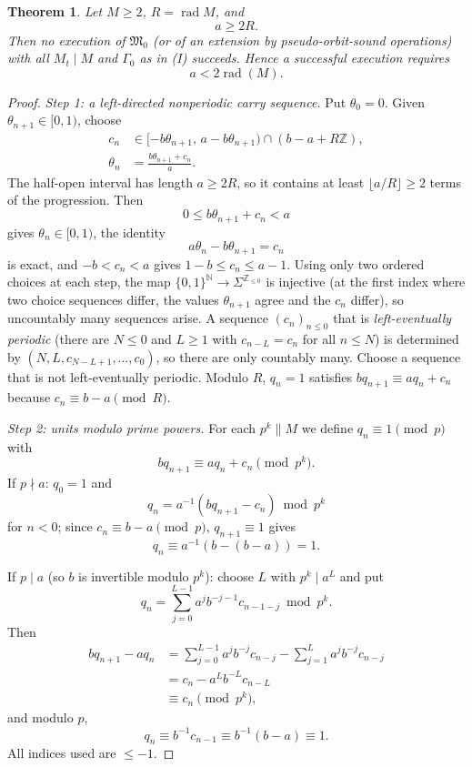 \documentclass[11pt,reqno]{amsart}
\newtheorem{theorem}{Theorem}
\theoremstyle{definition}
\theoremstyle{remark}
\begin{document}
\begin{samepage}
\begin{theorem}\leavevmode\label{thm:39}
Let \(M\ge2\), \(R=\operatorname{rad}M\), and
\[
a\ge2R.
\]
Then no execution of \(\mathfrak M_0\) (or of an extension by
pseudo-orbit-sound operations) with all \(M_t\mid M\) and \(\Gamma_0\) as
in (I) succeeds. Hence a successful execution requires
\[
a<2\operatorname{rad}(M).
\tag{27}\label{eq:27}
\]
\label{thm-end:39}
\end{theorem}
\end{samepage}

\begin{proof}\leavevmode\label{proof:39}
\emph{Step 1: a left-directed nonperiodic carry sequence.} Put
\(\theta_0=0\). Given \(\theta_{n+1}\in[0,1)\), choose
\[
\begin{aligned}
c_n&\in[-b\theta_{n+1},\,a-b\theta_{n+1})\cap(b-a+R\mathbb Z),\\
\theta_n&=\frac{b\theta_{n+1}+c_n}{a}.
\end{aligned}
\]
The half-open interval has length \(a\ge2R\), so it contains at least
\(\lfloor a/R\rfloor\ge2\) terms of the progression. Then
\[
0\le b\theta_{n+1}+c_n<a
\]
gives \(\theta_n\in[0,1)\), the identity
\[
a\theta_n-b\theta_{n+1}=c_n
\]
is exact, and \(-b<c_n<a\) gives
\(1-b\le c_n\le a-1\). Using only two ordered choices at each step, the
map \(\{0,1\}^{\mathbb N}\to\Sigma^{\mathbb Z_{\le0}}\) is injective
(at the first index where two choice sequences differ, the values
\(\theta_{n+1}\) agree and the \(c_n\) differ), so uncountably many
sequences arise. A sequence \((c_n)_{n\le0}\) that is \emph{left-eventually
periodic} (there are \(N\le0\) and \(L\ge1\) with \(c_{n-L}=c_n\) for
all \(n\le N\)) is determined by \((N,L,c_{N-L+1},\ldots,c_0)\), so
there are only countably many. Choose a sequence that is not
left-eventually periodic. Modulo \(R\), \(q_n=1\) satisfies
\(bq_{n+1}\equiv aq_n+c_n\) because \(c_n\equiv b-a\pmod R\).

\emph{Step 2: units modulo prime powers.} For each \(p^k\parallel M\) we
define \(q_n\equiv1\pmod p\) with
\[
bq_{n+1}\equiv aq_n+c_n\pmod{p^k}.
\]
If \(p\nmid a\): \(q_0=1\) and
\[
q_n=a^{-1}(bq_{n+1}-c_n)\bmod p^k
\]
for \(n<0\); since
\(c_n\equiv b-a\pmod p\), \(q_{n+1}\equiv1\) gives
\[
q_n\equiv a^{-1}(b-(b-a))=1.
\]

If \(p\mid a\) (so \(b\) is invertible
modulo \(p^k\)): choose \(L\) with \(p^k\mid a^L\) and put
\[
q_n=\sum_{j=0}^{L-1}a^jb^{-j-1}c_{n-1-j}\bmod p^k.
\]
Then
\[
\begin{aligned}
bq_{n+1}-aq_n&=\sum_{j=0}^{L-1}a^jb^{-j}c_{n-j}-\sum_{j=1}^{L}a^jb^{-j}c_{n-j}\\
&=c_n-a^Lb^{-L}c_{n-L}\\
&\equiv c_n\pmod{p^k},
\end{aligned}
\]
and modulo \(p\),
\[
q_n\equiv b^{-1}c_{n-1}\equiv b^{-1}(b-a)\equiv1.
\]
All indices used are \(\le-1\).


\end{proof}
\end{document}
